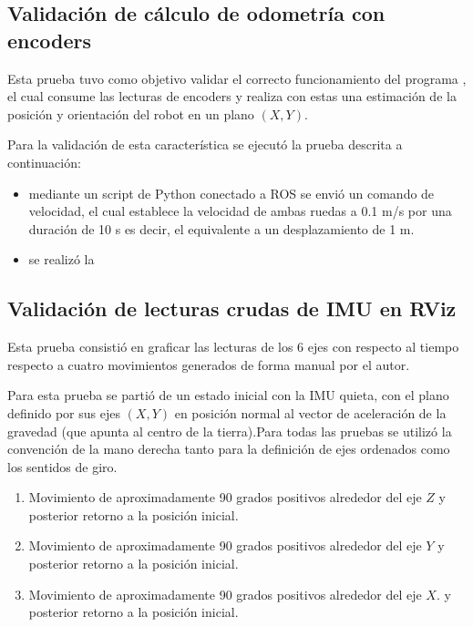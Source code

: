 \subsection{Validación de cálculo de odometría con encoders}

Esta prueba tuvo como objetivo validar el correcto funcionamiento del programa , el cual consume las lecturas de encoders y realiza con estas una estimación de la posición y orientación del robot en un plano $(X,Y)$.

Para la validación de esta característica se ejecutó la prueba descrita a continuación:

\begin{itemize}
    \item mediante un script de Python conectado a ROS se envió un comando de velocidad, el cual establece la velocidad de ambas ruedas a 0.1 m/s por una duración de 10 s es decir, el equivalente a un desplazamiento de 1 m.
    \item se realizó la
\end{itemize}

\subsection{Validación de lecturas crudas de IMU en RViz}

Esta prueba consistió en graficar las lecturas de los 6 ejes con respecto al tiempo respecto a cuatro movimientos generados de forma manual por el autor.

Para esta prueba se partió de un estado inicial con la IMU quieta, con el plano definido por sus ejes $(X,Y)$ en posición normal al vector de aceleración de la gravedad (que apunta al centro de la tierra).Para todas las pruebas se utilizó la convención de la mano derecha tanto para la definición de ejes ordenados como los sentidos de giro.

\begin{enumerate}
    \item Movimiento de aproximadamente 90 grados positivos alrededor del eje $Z$ y posterior retorno a la posición inicial.
    \item Movimiento de aproximadamente 90 grados positivos alrededor del eje $Y$ y posterior retorno a la posición inicial.
    \item Movimiento de aproximadamente 90 grados positivos alrededor del eje $X$. y posterior retorno a la posición inicial.
\end{enumerate}


